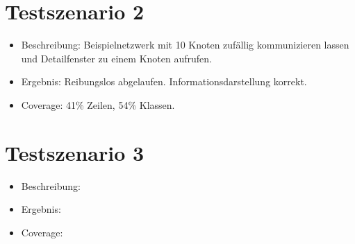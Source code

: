 \section{Testszenario 2}

\begin{itemize}
  \item Beschreibung: Beispielnetzwerk mit 10 Knoten zufällig kommunizieren lassen und Detailfenster zu einem Knoten aufrufen.
  \item Ergebnis: Reibungslos abgelaufen. Informationsdarstellung korrekt.
  \item Coverage: 41\% Zeilen, 54\% Klassen.
\end{itemize}

\section{Testszenario 3}

\begin{itemize}
  \item Beschreibung:
  \item Ergebnis:
  \item Coverage:
\end{itemize}